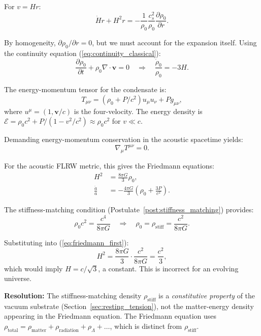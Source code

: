 \documentclass[11pt,a4paper]{article}
\newcommand{\rhostiff}{\ensuremath{\rho_{\mathrm{stiff}}}}
\theoremstyle{definition}
\theoremstyle{remark}
\begin{document}
For $v = H r$:
\begin{equation}
\dot{H}r + H^2 r = -\frac{1}{\rho_0}\frac{c_s^2}{\rho_0}\frac{\partial \rho_0}{\partial r}.
\end{equation}

By homogeneity, $\partial\rho_0/\partial r = 0$, but we must account for the expansion itself. Using the continuity equation (\ref{eq:continuity_classical}):
\begin{equation}
\frac{\partial\rho_0}{\partial t} + \rho_0 \nabla \cdot \mathbf{v} = 0 \quad \Rightarrow \quad \frac{\dot{\rho}_0}{\rho_0} = -3H.
\end{equation}

The energy-momentum tensor for the condensate is:
\begin{equation}
T_{\mu\nu} = (\rho_0 + P/c^2)u_\mu u_\nu + P g_{\mu\nu},
\end{equation}
where $u^\mu = (1, \mathbf{v}/c)$ is the four-velocity. The energy density is $\mathcal{E} = \rho_0 c^2 + P/(1-v^2/c^2) \approx \rho_0 c^2$ for $v \ll c$.

Demanding energy-momentum conservation in the acoustic spacetime yields:
\begin{equation}
\nabla_\mu T^{\mu\nu} = 0.
\end{equation}

For the acoustic FLRW metric, this gives the Friedmann equations:
\begin{align}
H^2 &= \frac{8\pi G}{3}\rho_0, \label{eq:friedmann_first} \\
\frac{\ddot{a}}{a} &= -\frac{4\pi G}{3}\left(\rho_0 + \frac{3P}{c^2}\right). \label{eq:friedmann_second}
\end{align}

The stiffness-matching condition (Postulate~\ref{post:stiffness_matching}) provides:
\begin{equation}
\label{eq:stiffness_condition}
\rho_0 c^2 = \frac{c^4}{8\pi G} \quad \Rightarrow \quad \rho_0 = \rhostiff = \frac{c^2}{8\pi G}.
\end{equation}

Substituting into (\ref{eq:friedmann_first}):
\begin{equation}
H^2 = \frac{8\pi G}{3}\cdot\frac{c^2}{8\pi G} = \frac{c^2}{3},
\end{equation}
which would imply $H = c/\sqrt{3}$, a constant. This is incorrect for an evolving universe.

\textbf{Resolution:} The stiffness-matching density $\rhostiff$ is a \emph{constitutive property} of the vacuum substrate (Section~\ref{sec:resting_tension}), not the matter-energy density appearing in the Friedmann equation. The Friedmann equation uses $\rho_{\mathrm{total}} = \rho_{\mathrm{matter}} + \rho_{\mathrm{radiation}} + \rho_\Lambda + \dots$, which is distinct from $\rhostiff$.
\end{document}
